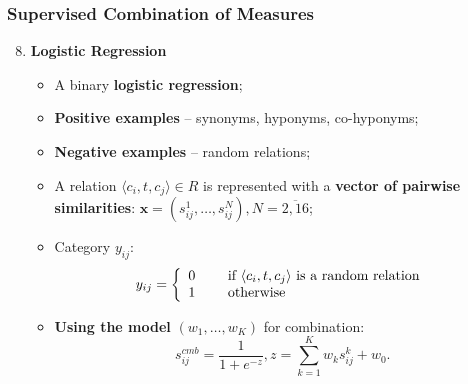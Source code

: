 \begin{frame}
\frametitle{Supervised Combination of Measures}

\begin{enumerate}
  \setcounter{enumi}{7}
\item \textbf{Logistic Regression} 

\begin{itemize}
  \item  A binary \textbf{logistic regression};

\item \textbf{Positive examples} -- synonyms,
hyponyms, co-hyponyms;
\item \textbf{Negative examples} -- random relations;

  \item A relation $\langle c_i,t, c_j \rangle \in R$ is represented with a \textbf{vector of pairwise similarities}: $\mathbf{x} = (s_{ij}^1,\ldots,s_{ij}^N), N=\overline{2,16}$; 

\item Category $y_{ij}$:
$$
y_{ij} = \left\{ 
  \begin{array}{l l}
    0 & \quad  \text{ if } \langle c_i,t, c_j \rangle \text{ is a random relation} 
    \\
    1 & \quad  \text{ otherwise }\\
  \end{array} \right
  .
$$

\item \textbf{Using the model} $(w_1,\ldots,w_K)$ for combination: 
$$s^{cmb}_{ij} = \frac{1}{1 + e^{-z}}, z = \sum_{k=1}^K w_k s^k_{ij} + w_0.$$

\end{itemize}
\end{enumerate}

\end{frame}



